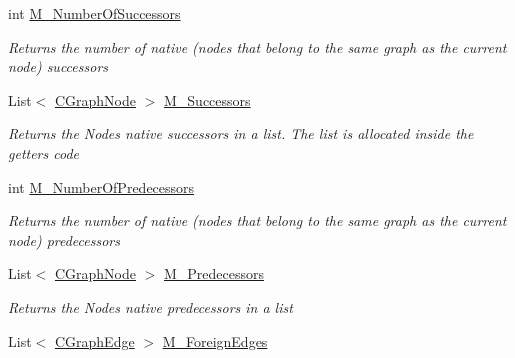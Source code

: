 \begin{DoxyCompactItemize}
\item 
int \hyperlink{class_graph_library_1_1_c_graph_node_a1a877b0e26c037d267bcdb4eb17087ae}{M\+\_\+\+Number\+Of\+Successors}
\begin{DoxyCompactList}\small\item\em Returns the number of native (nodes that belong to the same graph as the current node) successors \end{DoxyCompactList}\item 
List$<$ \hyperlink{class_graph_library_1_1_c_graph_node}{C\+Graph\+Node} $>$ \hyperlink{class_graph_library_1_1_c_graph_node_a5f3bca4eb56bce992ef018820bdd20c4}{M\+\_\+\+Successors}
\begin{DoxyCompactList}\small\item\em Returns the Node\textquotesingle{}s native successors in a list. The list is allocated inside the getter\textquotesingle{}s code \end{DoxyCompactList}\item 
int \hyperlink{class_graph_library_1_1_c_graph_node_ac0f1e583a6b672b03e146cb730b1682a}{M\+\_\+\+Number\+Of\+Predecessors}
\begin{DoxyCompactList}\small\item\em Returns the number of native (nodes that belong to the same graph as the current node) predecessors \end{DoxyCompactList}\item 
List$<$ \hyperlink{class_graph_library_1_1_c_graph_node}{C\+Graph\+Node} $>$ \hyperlink{class_graph_library_1_1_c_graph_node_a428ee478ef04cd06956671a94dafdbc5}{M\+\_\+\+Predecessors}
\begin{DoxyCompactList}\small\item\em Returns the Node\textquotesingle{}s native predecessors in a list \end{DoxyCompactList}\item 
List$<$ \hyperlink{class_graph_library_1_1_c_graph_edge}{C\+Graph\+Edge} $>$ \hyperlink{class_graph_library_1_1_c_graph_node_af1dd68175bb884b10c5972c57b3c243f}{M\+\_\+\+Foreign\+Edges}

\end{DoxyCompactItemize}
